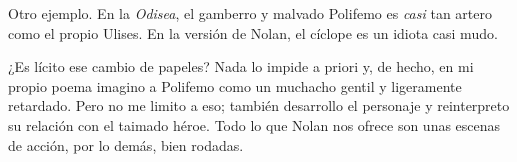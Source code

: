 Otro ejemplo. En la \emph{Odisea}, el gamberro y malvado Polifemo es \emph{casi} tan artero como el propio Ulises. En la versión de Nolan, el cíclope es un idiota casi mudo.

¿Es lícito ese cambio de papeles? Nada lo impide a priori y, de hecho, en mi propio poema imagino a Polifemo como un muchacho gentil y ligeramente retardado. Pero no me limito a eso; también desarrollo el personaje y reinterpreto su relación con el taimado héroe. Todo lo que Nolan nos ofrece son unas escenas de acción, por lo demás, bien rodadas.
%
%
%
%
%
%
%
%

